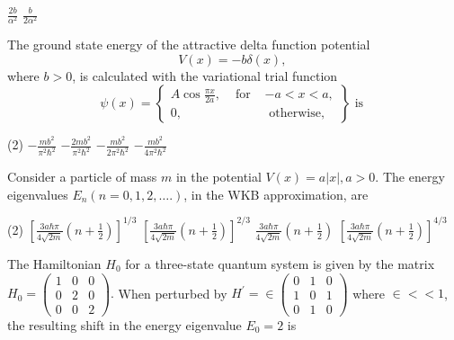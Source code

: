\begin{enumerate}
\begin{tasks}
	\task[\textbf{C.}]$\frac{2 b}{\alpha^{2}}$
	\task[\textbf{D.}]$\frac{b}{2 \alpha^{2}}$
\end{tasks}
\begin{minipage}{\textwidth}
	\item The ground state energy of the attractive delta function potential
	$$
	V(x)=-b \delta(x) \text {, }
	$$
	where $b>0$, is calculated with the variational trial function
	$$
	\psi(x)=\left\{\begin{array}{ccc}
	A \cos \frac{\pi x}{2 a}, & \text { for } & -a<x<a, \\
	0, & & \text { otherwise, }
	\end{array}\right\} \text { is }
	$$
\end{minipage}
\begin{tasks}(2)
	\task[\textbf{A.}] $-\frac{m b^{2}}{\pi^{2} \hbar^{2}}$
	\task[\textbf{B.}]$-\frac{2 m b^{2}}{\pi^{2} \hbar^{2}}$
	\task[\textbf{C.}]$-\frac{m b^{2}}{2 \pi^{2} \hbar^{2}}$
	\task[\textbf{D.}]$-\frac{m b^{2}}{4 \pi^{2} \hbar^{2}}$
\end{tasks}
\begin{minipage}{\textwidth}
	\item Consider a particle of mass $m$ in the potential $V(x)=a|x|, a>0$. The energy eigenvalues $E_{n}(n=0,1,2, \ldots .)$, in the WKB approximation, are
\end{minipage}
\begin{tasks}(2)
	\task[\textbf{A.}] $\left[\frac{3 a \hbar \pi}{4 \sqrt{2 m}}\left(n+\frac{1}{2}\right)\right]^{1 / 3}$
	\task[\textbf{B.}]$\left[\frac{3 a \hbar \pi}{4 \sqrt{2 m}}\left(n+\frac{1}{2}\right)\right]^{2 / 3}$
	\task[\textbf{C.}]$\frac{3 a \hbar \pi}{4 \sqrt{2 m}}\left(n+\frac{1}{2}\right)$
	\task[\textbf{D.}]$\left[\frac{3 a \hbar \pi}{4 \sqrt{2 m}}\left(n+\frac{1}{2}\right)\right]^{4 / 3}$
\end{tasks}
\begin{minipage}{\textwidth}
	\item The Hamiltonian $H_{0}$ for a three-state quantum system is given by the matrix $H_{0}=\left(\begin{array}{lll}1 & 0 & 0 \\ 0 & 2 & 0 \\ 0 & 0 & 2\end{array}\right) .$ When perturbed by $H^{\prime}=\in\left(\begin{array}{lll}0 & 1 & 0 \\ 1 & 0 & 1 \\ 0 & 1 & 0\end{array}\right)$ where $\in<<1$, the resulting shift in the energy eigenvalue $E_{0}=2$ is

\end{minipage}
\end{enumerate}
